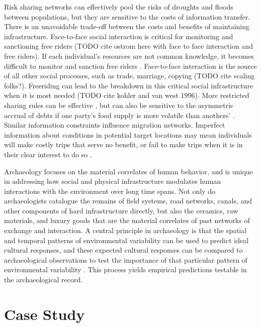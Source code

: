 \documentclass[10pt]{iopart}
\begin{document}
Risk sharing networks can effectively pool the risks of droughts and floods between populations, but they are sensitive to the costs of information transfer. There is an unavoidable trade-off between the costs and benefits of maintaining infrastructure. Face-to-face social interaction is critical for monitoring and sanctioning free riders (TODO cite ostrom here with face to face interaction and free riders). If each individual's resources are not common knowledge, it becomes difficult to monitor and sanction free riders \parencite{Hao2015a}. Face-to-face interaction is the source of all other social processes, such as trade, marriage, copying (TODO cite scaling folks?). Freeriding can lead to the breakdown in this critical social infrastructure when it is most needed (TODO cite kohler and van west 1996). More restricted sharing rules can be effective \parencite{Hegmon1996}, but can also be sensitive to the asymmetric accrual of debts if one party's food supply is more volatile than anothers' \parencite{Crabtree2015}. Similar information constraints influence migration networks. Imperfect information about conditions in potential target locations may mean individuals will make costly trips that serve no benefit, or fail to make trips when it is in their clear interest to do so \parencite{Anderies2011a}. 

Archaeology focuses on the material correlates of human behavior, and is unique in addressing how social and physical infrastructure modulates human interactions with the environment over long time spans. Not only do archaeologists catalogue the remains of field systems, road networks, canals, and other components of hard infrastructure directly, but also the ceramics, raw materials, and luxury goods that are the material correlates of past networks of exchange and interaction. A central principle in archaeology is that the spatial and temporal patterns of environmental variability can be used to predict ideal cultural responses, and these expected cultural responses can be compared to archaeological observations to test the importance of that particular pattern of environmental variability \parencite{halstead1989}. This process yields empirical predictions testable in the archaeological record. 

\section*{Case Study}
\end{document}
